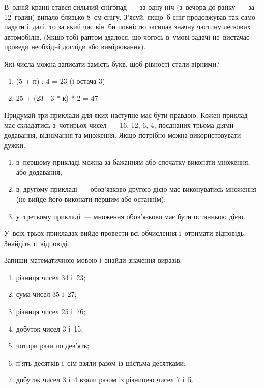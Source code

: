\problem
В~одній країні стався сильний снігопад~--- за одну ніч
(з~вечора до ранку~--- за 12~годин) випало близько 8~см снігу.
З'ясуй, якщо~б сніг продовжував так само падати і~далі,
то за який час він~би повністю засипав значну частину легкових автомобілів.
(Якщо тобі раптом здалося, що чогось в~умові задачі не~вистачає~---
проведи необхідні досліди або вимірювання).


\problem
Які числа можна записати замість букв, щоб рівності стали вірними?
\begin{enumerate}
    \item (5 + п) : 4 = 23 (і остача 3)
    \item 25 + (23 - 3 * к) * 2 = 47
\end{enumerate}


\problem
Придумай три приклади для яких наступне має бути правдою.
Кожен приклад має складатись з~чотирьох чисел~--- 16, 12, 6, 4,
поєднаних трьома діями~--- додавання, віднімання та множення.
Якщо потрібно можна використовувати дужки.
\begin{enumerate}
    \item в~першому прикладі можна за бажанням або
    спочатку виконати множення, або додавання;
    \item в~другому прикладі~--- обов'язково другою дією має
    виконуватись множення (не вийде його виконати першим або останнім);
    \item у~третьому прикладі~--- множення обов'язково має бути останньою дією.
\end{enumerate}
У~всіх трьох прикладах вийде провести всі обчислення і~отримати відповідь. Знайдіть ті відповіді.


\problem
Запиши математичною мовою і~знайди значення виразів:
\begin{enumerate}
    \item різниця чисел 34 і~23;
    \item сума чисел 35 і~27;
    \item різниця чисел 25 і~76;
    \item добуток чисел 3 і~15;
    \item чотири рази по дев'ять;
    \item п'ять десятків і~сім взяли разом із шістьма десятками;
    \item добуток чисел 3 і~4 взяли разом із різницею чисел 7 і~5.
\end{enumerate}


